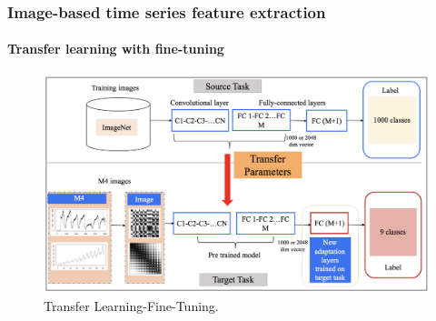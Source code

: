 \documentclass[10pt,aspectratio=43]{beamer}
\begin{document}
\begin{frame}
  \frametitle{Image-based time series feature extraction}
  \framesubtitle{Transfer learning with fine-tuning}

\begin{figure}[thb]
  \centering
  \includegraphics[width=0.8\linewidth]{figures/transfer-learning.jpg}
  \caption{\footnotesize{Transfer Learning-Fine-Tuning. }}
  \label{fig:transfer-learning}
\end{figure}
\end{frame}
\end{document}
